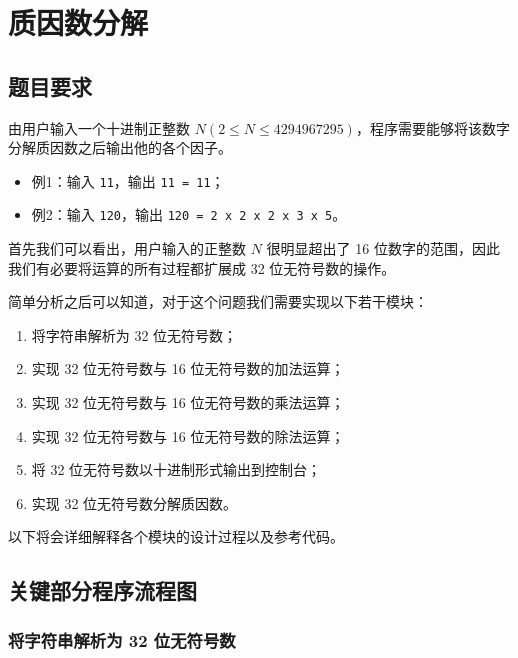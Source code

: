\section{质因数分解}

\subsection{题目要求}

由用户输入一个十进制正整数 $N(2 \le N \le 4294967295)$，程序需要能够将该数字分解质因数之后输出他的各个因子。

\begin{itemize}
  \item 例1：输入 \verb|11|，输出 \verb|11 = 11|；
  \item 例2：输入 \verb|120|，输出 \verb|120 = 2 x 2 x 2 x 3 x 5|。
\end{itemize}

首先我们可以看出，用户输入的正整数 $N$ 很明显超出了 16 位数字的范围，因此我们有必要将运算的所有过程都扩展成 32 位无符号数的操作。

简单分析之后可以知道，对于这个问题我们需要实现以下若干模块：

\begin{enumerate}
  \item 将字符串解析为 32 位无符号数；
  \item 实现 32 位无符号数与 16 位无符号数的加法运算；
  \item 实现 32 位无符号数与 16 位无符号数的乘法运算；
  \item 实现 32 位无符号数与 16 位无符号数的除法运算；
  \item 将 32 位无符号数以十进制形式输出到控制台；
  \item 实现 32 位无符号数分解质因数。
\end{enumerate}

以下将会详细解释各个模块的设计过程以及参考代码。

\subsection{关键部分程序流程图}

\subsubsection{将字符串解析为 32 位无符号数}

